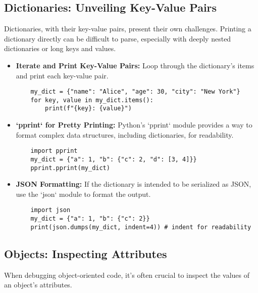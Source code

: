 \documentclass{article}
\begin{document}
\subsection*{Dictionaries: Unveiling Key-Value Pairs}

Dictionaries, with their key-value pairs, present their own challenges. Printing a dictionary directly can be difficult to parse, especially with deeply nested dictionaries or long keys and values.

\begin{itemize}
    \item \textbf{Iterate and Print Key-Value Pairs:} Loop through the dictionary's items and print each key-value pair.

    \begin{verbatim}
    my_dict = {"name": "Alice", "age": 30, "city": "New York"}
    for key, value in my_dict.items():
        print(f"{key}: {value}")
    \end{verbatim}

    \item \textbf{`pprint` for Pretty Printing:} Python's `pprint` module provides a way to format complex data structures, including dictionaries, for readability.

    \begin{verbatim}
    import pprint
    my_dict = {"a": 1, "b": {"c": 2, "d": [3, 4]}}
    pprint.pprint(my_dict)
    \end{verbatim}

    \item \textbf{JSON Formatting:} If the dictionary is intended to be serialized as JSON, use the `json` module to format the output.

    \begin{verbatim}
    import json
    my_dict = {"a": 1, "b": {"c": 2}}
    print(json.dumps(my_dict, indent=4)) # indent for readability
    \end{verbatim}
\end{itemize}

\subsection*{Objects: Inspecting Attributes}

When debugging object-oriented code, it's often crucial to inspect the values of an object's attributes.
\end{document}
